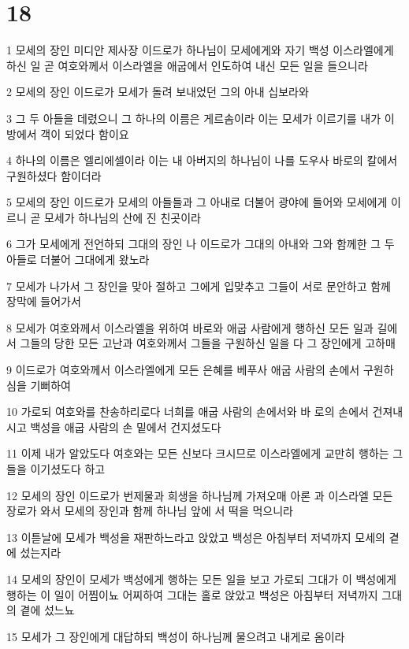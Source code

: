 \chapter{18}

\par 1 모세의 장인 미디안 제사장 이드로가 하나님이 모세에게와 자기 백성 이스라엘에게 하신 일 곧 여호와께서 이스라엘을 애굽에서 인도하여 내신 모든 일을 들으니라
\par 2 모세의 장인 이드로가 모세가 돌려 보내었던 그의 아내 십보라와
\par 3 그 두 아들을 데렸으니 그 하나의 이름은 게르솜이라 이는 모세가 이르기를 내가 이방에서 객이 되었다 함이요
\par 4 하나의 이름은 엘리에셀이라 이는 내 아버지의 하나님이 나를 도우사 바로의 칼에서 구원하셨다 함이더라
\par 5 모세의 장인 이드로가 모세의 아들들과 그 아내로 더불어 광야에 들어와 모세에게 이르니 곧 모세가 하나님의 산에 진 친곳이라
\par 6 그가 모세에게 전언하되 그대의 장인 나 이드로가 그대의 아내와 그와 함께한 그 두 아들로 더불어 그대에게 왔노라
\par 7 모세가 나가서 그 장인을 맞아 절하고 그에게 입맞추고 그들이 서로 문안하고 함께 장막에 들어가서
\par 8 모세가 여호와께서 이스라엘을 위하여 바로와 애굽 사람에게 행하신 모든 일과 길에서 그들의 당한 모든 고난과 여호와께서 그들을 구원하신 일을 다 그 장인에게 고하매
\par 9 이드로가 여호와께서 이스라엘에게 모든 은혜를 베푸사 애굽 사람의 손에서 구원하심을 기뻐하여
\par 10 가로되 여호와를 찬송하리로다 너희를 애굽 사람의 손에서와 바 로의 손에서 건져내시고 백성을 애굽 사람의 손 밑에서 건지셨도다
\par 11 이제 내가 알았도다 여호와는 모든 신보다 크시므로 이스라엘에게 교만히 행하는 그들을 이기셨도다 하고
\par 12 모세의 장인 이드로가 번제물과 희생을 하나님께 가져오매 아론 과 이스라엘 모든 장로가 와서 모세의 장인과 함께 하나님 앞에 서 떡을 먹으니라
\par 13 이튿날에 모세가 백성을 재판하느라고 앉았고 백성은 아침부터 저녁까지 모세의 곁에 섰는지라
\par 14 모세의 장인이 모세가 백성에게 행하는 모든 일을 보고 가로되 그대가 이 백성에게 행하는 이 일이 어찜이뇨 어찌하여 그대는 홀로 앉았고 백성은 아침부터 저녁까지 그대의 곁에 섰느뇨
\par 15 모세가 그 장인에게 대답하되 백성이 하나님께 물으려고 내게로 옴이라
